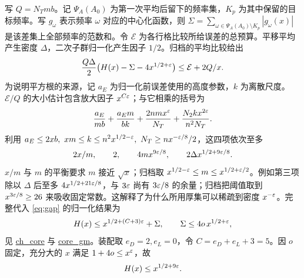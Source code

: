 \documentclass[UTF8,fontset=none,a4paper,11pt]{ctexart}
\theoremstyle{definition}
\newcommand{\src}[3]{\href{https://github.com/leanprover-community/riemann-hypothesis/blob/23aebbb302010b292314d406aa97f7901d698634/src/#1.lean\#L#2}{#3}}
\begin{document}
写 $Q=N_Tmb$。记 $\Psi_A(A_0)$ 为第一次平均后留下的频率集，$K_p$ 为其中保留的目标频率。写 $g_\omega$ 表示频率 $\omega$ 对应的中心化函数，则 $\Sigma=\sum_{\omega\in\Psi_A(A_0)\setminus K_p}|g_\omega(x)|$ 是该差集上全部频率的范数和。令 $\mathcal E$ 为各行格比较所给误差的总预算。平移平均产生密度 $\Delta$，二次子群归一化产生因子 $1/2$。归档的平均比较给出
\begin{equation}
 \frac{Q\Delta}{2}\bigl(H(x)-\Sigma-4x^{1/2+\varepsilon}\bigr)
    \le \mathcal E+2Q/x . \label{eq:gap}
\end{equation}
为说明平方根的来源，记 $a_E$ 为归一化前误差使用的高度参数，$k$ 为离散尺度。$\mathcal E/Q$ 的大小估计包含放大因子 $x^{C\varepsilon}$；与它相乘的括号为
\[
 \frac{a_E}{mb}+\frac{a_E m}{bk}
   +\frac{2nmx^\varepsilon}{N_T}+\frac{N_2 k x^{2\varepsilon}}{n^2N_T}.
\]
利用 $a_E\le2xb,\ xm\le k\le n^2x^{1/2-\varepsilon},\ N_T\ge nx^{-\varepsilon/8}/2$，这四项依次至多
\[
 2x/m,\qquad 2,\qquad 4mx^{9\varepsilon/8},\qquad 2\Delta x^{1/2+9\varepsilon/8}.
\]
$x/m$ 与 $m$ 的平衡要求 $m$ 接近 $\sqrt x$；归档取 $x^{1/2-\varepsilon}\le m\le x^{1/2+\varepsilon/2}$。例如第三项除以 $\Delta$ 后至多 $4x^{1/2+21\varepsilon/8}$，与 $3\varepsilon$ 尚有 $3\varepsilon/8$ 的余量；归档把阈值取到 $x^{3\varepsilon/8}\ge26$ 来吸收固定常数。这解释了为什么所用厚集可以稀疏到密度 $x^{-\varepsilon}$。完整代入 \eqref{eq:gap} 的归一化结果为
\[
 H(x)\le x^{1/2+(C+3)\varepsilon}+\Sigma,\qquad
 \Sigma\le4o\,x^{1/2+\varepsilon},
\]
见 \src{Development/AutomorphicArithmetic/DedekindLFunctions/LandauTheorems/ChCore}{343}{ch\_core}
与 \src{Development/AutomorphicArithmetic/PrimitiveCosets/CoreGm}{12}{core\_gm}。装配取 $e_D=2,e_L=0$，令 $C=e_D+e_L+3=5$。因 $o$ 固定，充分大的 $x$ 满足 $1+4o\le x^\varepsilon$，故
\begin{equation}
                  H(x)\le x^{1/2+9\varepsilon}. \label{eq:final}
\end{equation}
\end{document}
